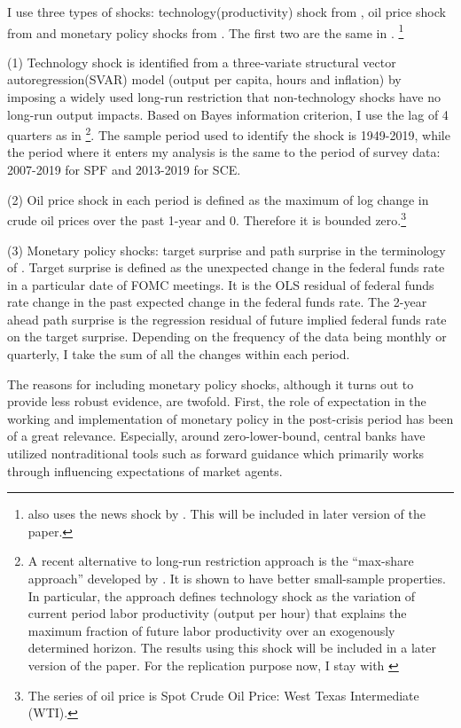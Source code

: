 \documentclass[12pt]{article}
\begin{document}
	I use three types of shocks: technology(productivity) shock from \citet{gali1999technology}, oil price shock from \citet{hamilton1996happened} and monetary policy shocks from  \citet{laseen2011anticipated}. The first two are the same in \citet{coibion2012can}. \footnote{ \citet{coibion2012can} also uses the news shock by \citet{barsky2011news}. This will be included in later version of the paper.} 
	
	
	(1) Technology shock is identified from a three-variate structural vector autoregression(SVAR) model  (output per capita, hours and inflation) by imposing a widely used long-run restriction that non-technology shocks have no long-run output impacts. Based on Bayes information criterion, I use the lag of 4 quarters as in \citet{coibion2012can} \footnote{A recent alternative to long-run restriction approach is the ``max-share approach'' developed by \citet{francis2014flexible}. It is shown to have better small-sample properties. In particular,  the approach defines technology shock as the variation of current period labor productivity (output per hour) that explains the maximum fraction of future labor productivity over an exogenously determined horizon. The results using this shock will be included in a later version of the paper. For the replication purpose now, I stay with \citet{gali1999technology}}. The sample period used to identify the shock is 1949-2019, while the period where it enters my analysis is the same to the period of survey data: 2007-2019 for SPF and 2013-2019 for SCE. 
	
	(2) Oil price shock in each period is defined as the maximum of log change in crude oil prices over the past 1-year and 0. Therefore it is bounded zero.\footnote{The series of oil price is Spot Crude Oil Price: West Texas Intermediate (WTI).}
	
	(3) Monetary policy shocks: target surprise and path surprise in the terminology of \citet{laseen2011anticipated}. Target surprise is defined as the unexpected change in the federal funds rate in a particular date of FOMC meetings. It is the OLS residual of federal funds rate change in the past expected change in the federal funds rate. The 2-year ahead path surprise is the regression residual of future implied federal funds rate on the target surprise. Depending on the frequency of the data being monthly or quarterly, I take the sum of all the changes within each period.   
	
	The reasons for including monetary policy shocks, although it turns out to provide less robust evidence, are twofold. First, the role of expectation in the working and implementation of monetary policy in the post-crisis period has been of a great relevance. Especially, around zero-lower-bound, central banks have utilized nontraditional tools such as forward guidance which primarily works through influencing expectations of market agents. 
		
\end{document}
